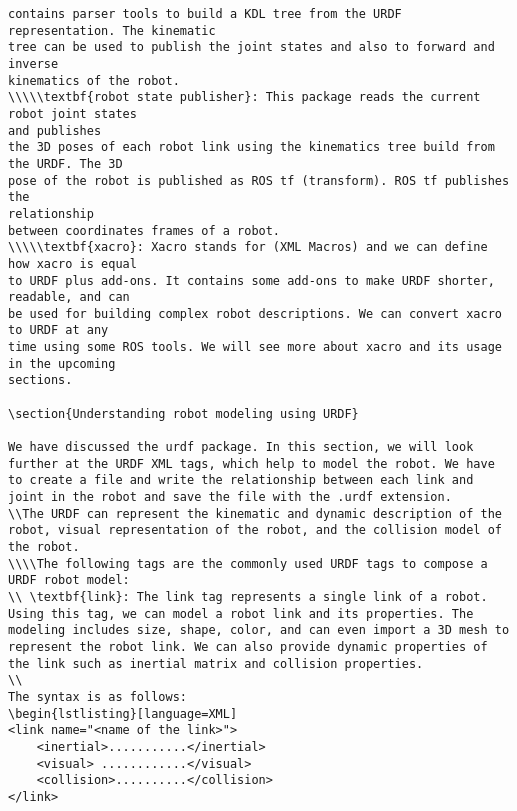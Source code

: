 \begin{lstlisting}
contains parser tools to build a KDL tree from the URDF representation. The kinematic 
tree can be used to publish the joint states and also to forward and inverse 
kinematics of the robot.
\\\\\textbf{robot state publisher}: This package reads the current robot joint states 
and publishes 
the 3D poses of each robot link using the kinematics tree build from the URDF. The 3D 
pose of the robot is published as ROS tf (transform). ROS tf publishes the 
relationship 
between coordinates frames of a robot.
\\\\\textbf{xacro}: Xacro stands for (XML Macros) and we can define how xacro is equal 
to URDF plus add-ons. It contains some add-ons to make URDF shorter, readable, and can 
be used for building complex robot descriptions. We can convert xacro to URDF at any 
time using some ROS tools. We will see more about xacro and its usage in the upcoming 
sections.

\section{Understanding robot modeling using URDF}

We have discussed the urdf package. In this section, we will look further at the URDF XML tags, which help to model the robot. We have to create a file and write the relationship between each link and joint in the robot and save the file with the .urdf extension.
\\The URDF can represent the kinematic and dynamic description of the robot, visual representation of the robot, and the collision model of the robot.
\\\\The following tags are the commonly used URDF tags to compose a URDF robot model:
\\ \textbf{link}: The link tag represents a single link of a robot. Using this tag, we can model a robot link and its properties. The modeling includes size, shape, color, and can even import a 3D mesh to represent the robot link. We can also provide dynamic properties of the link such as inertial matrix and collision properties.
\\
The syntax is as follows:
\begin{lstlisting}[language=XML]
<link name="<name of the link>">
    <inertial>...........</inertial>
    <visual> ............</visual>
    <collision>..........</collision>
</link>
\end{lstlisting}

